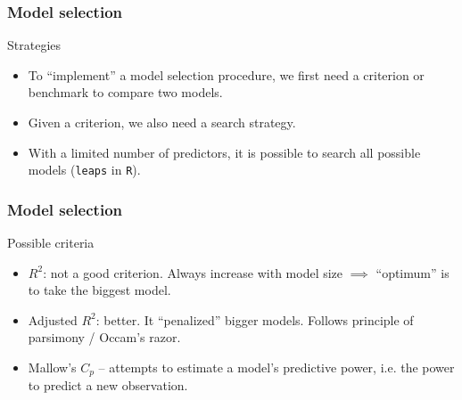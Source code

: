 \documentclass[handout]{beamer}
\begin{document}

   \begin{frame} \frametitle{Model selection}

   \begin{block}
   {Strategies}
   \begin{itemize}

   \item To ``implement'' a model selection procedure, we first need a criterion or benchmark to compare two models.
   \item Given a criterion, we also need a search strategy.

   \item With a limited number of predictors, it is possible to search all possible models ({\tt leaps} in {\tt R}).
   \end{itemize}
   \end{block}
   \end{frame}


   \begin{frame} \frametitle{Model selection}

   \begin{block}
   {Possible criteria   }

   \begin{itemize}[<+->]

   \item $R^2$: not a good criterion. Always increase with model size $\implies$ ``optimum'' is to take the biggest model.

   \item Adjusted $R^2$: better. It ``penalized'' bigger models.
   Follows principle of parsimony / Occam's razor.

   \item Mallow's $C_p$ -- attempts to estimate a model's predictive power, i.e. the power to predict a new observation.
   \end{itemize}
   \end{block}
   \end{frame}

\end{document}
